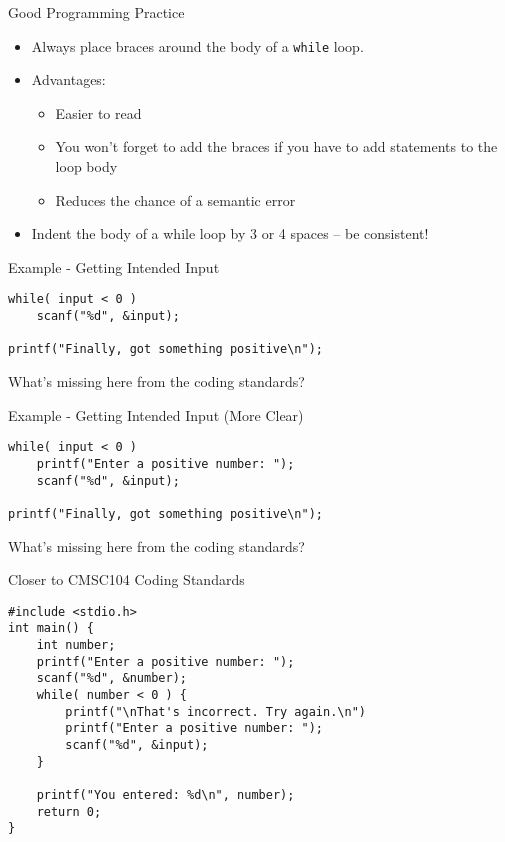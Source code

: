 \documentclass[graphics]{beamer}
\begin{document}
\begin{frame}{Good Programming Practice}
    \begin{itemize}
        \item Always place braces around the body of a \texttt{while} loop.
        \item Advantages:
        \begin{itemize}
            \item Easier to read
            \item You won't forget to add the braces if you have to add statements to the loop body
            \item Reduces the chance of a semantic error
        \end{itemize}
        \item Indent the body of a while loop by 3 or 4 spaces -- be consistent!
    \end{itemize}
\end{frame}

\begin{frame}[fragile]{Example - Getting Intended Input}
\begin{verbatim}
while( input < 0 )
    scanf("%d", &input);

printf("Finally, got something positive\n");
\end{verbatim}

\footnotesize What's missing here from the coding standards?
\end{frame}

\begin{frame}[fragile]{Example - Getting Intended Input (More Clear)}
\begin{verbatim}
while( input < 0 )
    printf("Enter a positive number: ");
    scanf("%d", &input);

printf("Finally, got something positive\n");
\end{verbatim}

\footnotesize What's missing here from the coding standards?
\end{frame}

\begin{frame}[fragile]{Closer to CMSC104 Coding Standards}
\begin{verbatim}
#include <stdio.h>
int main() {
    int number;
    printf("Enter a positive number: ");
    scanf("%d", &number);
    while( number < 0 ) {
        printf("\nThat's incorrect. Try again.\n")
        printf("Enter a positive number: ");
        scanf("%d", &input);
    }

    printf("You entered: %d\n", number);
    return 0;
}
\end{verbatim}
\end{frame}
\end{document}
